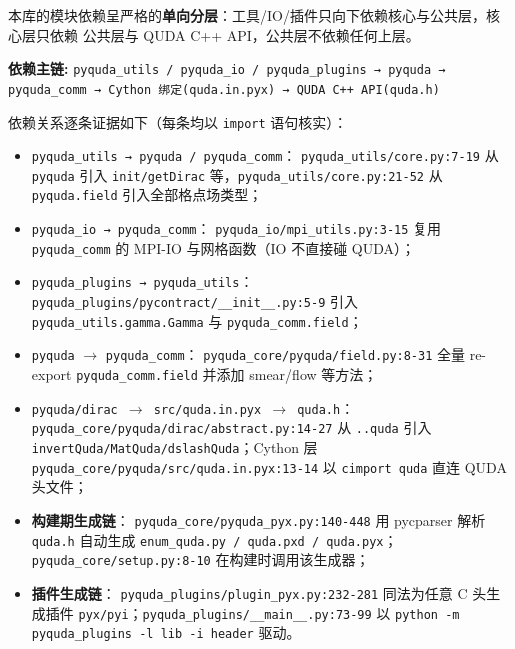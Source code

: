 \documentclass[UTF8]{ctexart}
\begin{document}
本库的模块依赖呈严格的\textbf{单向分层}：工具/IO/插件只向下依赖核心与公共层，核心层只依赖
公共层与 QUDA C++ API，公共层不依赖任何上层。

\begin{keybox}
\textbf{依赖主链:}
\textcolor{relation}{\texttt{pyquda\_utils / pyquda\_io / pyquda\_plugins → pyquda →
pyquda\_comm → Cython 绑定(quda.in.pyx) → QUDA C++ API(quda.h)}}
\end{keybox}

依赖关系逐条证据如下（每条均以 \texttt{import} 语句核实）：
\begin{itemize}
  \item \textcolor{relation}{\texttt{pyquda\_utils → pyquda / pyquda\_comm}}：
        \texttt{\nolinkurl{pyquda_utils/core.py:7-19}} 从 \texttt{pyquda} 引入
        \texttt{init/getDirac} 等，\texttt{\nolinkurl{pyquda_utils/core.py:21-52}} 从
        \texttt{pyquda.field} 引入全部格点场类型；
  \item \textcolor{relation}{\texttt{pyquda\_io → pyquda\_comm}}：
        \texttt{\nolinkurl{pyquda_io/mpi_utils.py:3-15}} 复用
        \texttt{pyquda\_comm} 的 MPI-IO 与网格函数（IO 不直接碰 QUDA）；
  \item \textcolor{relation}{\texttt{pyquda\_plugins → pyquda\_utils}}：
        \texttt{\nolinkurl{pyquda_plugins/pycontract/__init__.py:5-9}} 引入
        \texttt{pyquda\_utils.gamma.Gamma} 与 \texttt{pyquda\_comm.field}；
  \item \textcolor{relation}{\texttt{pyquda} $\rightarrow$ \texttt{pyquda\_comm}}：
        \texttt{\nolinkurl{pyquda_core/pyquda/field.py:8-31}} 全量 re-export
        \texttt{\nolinkurl{pyquda_comm.field}} 并添加 smear/flow 等方法；
  \item \textcolor{relation}{\texttt{pyquda/dirac $\rightarrow$ src/quda.in.pyx $\rightarrow$ quda.h}}：
        \texttt{\nolinkurl{pyquda_core/pyquda/dirac/abstract.py:14-27}} 从
        \texttt{..quda} 引入 \texttt{invertQuda/MatQuda/dslashQuda}；Cython 层
        \texttt{\nolinkurl{pyquda_core/pyquda/src/quda.in.pyx:13-14}} 以
        \texttt{cimport quda} 直连 QUDA 头文件；
  \item \textcolor{relation}{\textbf{构建期生成链}}：
        \texttt{\nolinkurl{pyquda_core/pyquda_pyx.py:140-448}} 用 pycparser 解析
        \texttt{quda.h} 自动生成 \texttt{enum\_quda.py / quda.pxd / quda.pyx}；
        \texttt{\nolinkurl{pyquda_core/setup.py:8-10}} 在构建时调用该生成器；
  \item \textcolor{relation}{\textbf{插件生成链}}：
        \texttt{\nolinkurl{pyquda_plugins/plugin_pyx.py:232-281}} 同法为任意
        C 头生成插件 \texttt{pyx/pyi}；\texttt{\nolinkurl{pyquda_plugins/__main__.py:73-99}}
        以 \texttt{python -m pyquda\_plugins -l lib -i header} 驱动。
\end{itemize}
\end{document}
